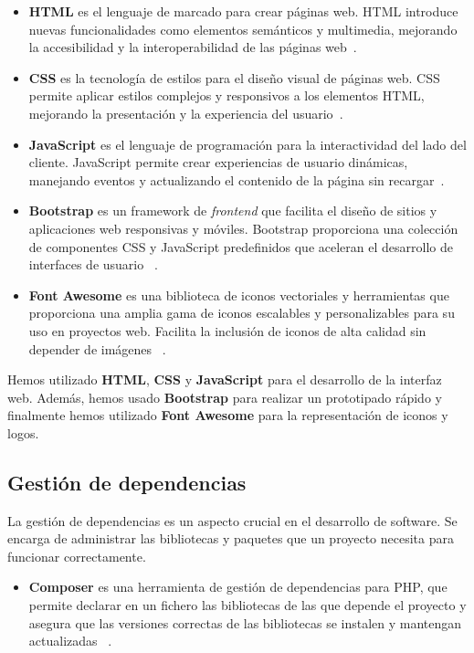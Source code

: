 \begin{itemize}
    \item \textbf{HTML} es el lenguaje de marcado para crear páginas web.
    HTML introduce nuevas funcionalidades como elementos semánticos y multimedia, mejorando la accesibilidad y la
    interoperabilidad de las páginas web~\cite{url_html5}.
    \item \textbf{CSS} es la tecnología de estilos para el diseño visual de páginas web.
    CSS permite aplicar estilos complejos y responsivos a los elementos HTML, mejorando la presentación y la
    experiencia del usuario~\cite{url_css3}.
    \item \textbf{JavaScript} es el lenguaje de programación para la interactividad del lado del cliente.
    JavaScript permite crear experiencias de usuario dinámicas, manejando eventos y actualizando el contenido de la
    página sin recargar~\cite{url_javascript}.
    \item \textbf{Bootstrap} es un framework de \textit{frontend} que facilita el diseño de sitios y aplicaciones web
    responsivas y móviles.
    Bootstrap proporciona una colección de componentes CSS y JavaScript predefinidos que aceleran el desarrollo de
    interfaces de usuario ~\cite{url_bootstrap}.
    \item \textbf{Font Awesome} es una biblioteca de iconos vectoriales y herramientas que proporciona una amplia
    gama de iconos escalables y personalizables para su uso en proyectos web.
    Facilita la inclusión de iconos de alta calidad sin depender de imágenes ~\cite{url_fontawesome}.
\end{itemize}

Hemos utilizado \textbf{HTML}, \textbf{CSS} y \textbf{JavaScript} para el desarrollo de la interfaz web.
Además, hemos usado \textbf{Bootstrap} para realizar un prototipado rápido y finalmente hemos utilizado
\textbf{Font Awesome} para la representación de iconos y logos.


\subsection{Gestión de dependencias}

La gestión de dependencias es un aspecto crucial en el desarrollo de software.
Se encarga de administrar las bibliotecas y paquetes que un proyecto necesita para funcionar correctamente.

\begin{itemize}
    \item \textbf{Composer}
    es una herramienta de gestión de dependencias para PHP, que permite declarar en un fichero las bibliotecas de las
    que depende el proyecto y asegura que las versiones correctas de las bibliotecas se instalen y mantengan
    actualizadas ~\cite{url_composer}.
\end{itemize}

